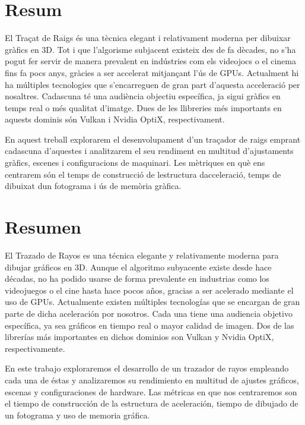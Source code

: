 

\chapter*{Resum}

El Traçat de Raigs és una tècnica elegant i relativament moderna per dibuixar gràfics en 3D. Tot i que l'algorisme subjacent existeix des de fa dècades, no s'ha pogut fer servir de manera prevalent en indústries com els videojocs o el cinema fins fa pocs anys, gràcies a ser accelerat mitjançant l'ús de GPUs. Actualment hi ha múltiples tecnologies que s'encarreguen de gran part d'aquesta acceleració per nosaltres. Cadascuna té una audiència objectiu específica, ja sigui gràfics en temps real o més qualitat d'imatge. Dues de les llibreries més importants en aquests dominis són Vulkan i Nvidia OptiX, respectivament.

En aquest treball explorarem el desenvolupament d'un traçador de raigs emprant cadascuna d'aquestes i analitzarem el seu rendiment en multitud d'ajustaments gràfics, escenes i configuracions de maquinari. Les mètriques en què ens centrarem són el temps de construcció de lestructura dacceleració, temps de dibuixat dun fotograma i ús de memòria gràfica.

\newpage

\chapter*{Resumen}

El Trazado de Rayos es una técnica elegante y relativamente moderna para dibujar gráficos en 3D. Aunque el algoritmo subyacente existe desde hace décadas, no ha podido usarse de forma prevalente en industrias como los videojuegos o el cine hasta hace pocos años, gracias a ser acelerado mediante el uso de GPUs. Actualmente existen múltiples tecnologías que se encargan de gran parte de dicha aceleración por nosotros. Cada una tiene una audiencia objetivo específica, ya sea gráficos en tiempo real o mayor calidad de imagen. Dos de las librerías más importantes en dichos dominios son Vulkan y Nvidia OptiX, respectivamente.

En este trabajo exploraremos el desarrollo de un trazador de rayos empleando cada una de éstas y analizaremos su rendimiento en multitud de ajustes gráficos, escenas y configuraciones de hardware. Las métricas en que nos centraremos son el tiempo de construcción de la estructura de aceleración, tiempo de dibujado de un fotograma y uso de memoria gráfica.

